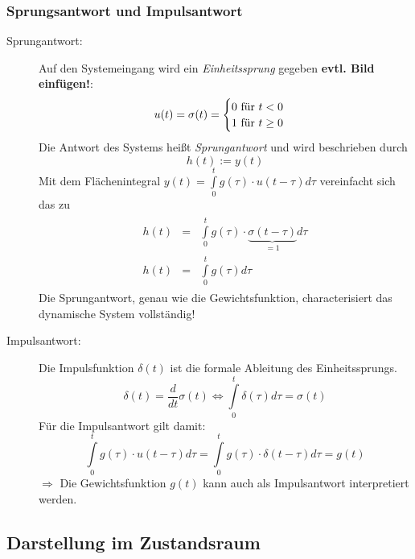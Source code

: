 \documentclass[12pt,a4paper,ngerman]{scrartcl}
\begin{document}
\subsubsection{Sprungsantwort und Impulsantwort}

\begin{description}
\item[Sprungantwort:] Auf den Systemeingang wird ein \emph{Einheitssprung} gegeben \textbf{evtl. Bild einfügen!}:
  \begin{equation*}
    u(t)=\sigma (t) =\begin{cases} 0 $ für $t<0\\1 $ für $ t \geq 0\end{cases}
  \end{equation*}
Die Antwort des Systems heißt \emph{Sprungantwort} und wird beschrieben durch
\begin{equation*}
  h(t):=y(t)
\end{equation*}
Mit dem Flächenintegral $y(t)=\int\limits_0^t{g(\tau)\cdot u(t-\tau)d\tau}$ vereinfacht sich das zu
\begin{align*}
  \begin{array}{lll}
    h(t)&=&\int\limits_0^t{g(\tau)\cdot \underbrace{\sigma (t-\tau)}_{=1}d\tau}\\
    h(t)&=&\int\limits_0^t{g(\tau)d\tau}  
  \end{array}
\end{align*}
Die Sprungantwort, genau wie die Gewichtsfunktion, characterisiert das dynamische System vollständig!
\item[Impulsantwort: ] Die Impulsfunktion $\delta (t)$ ist die formale Ableitung des Einheitssprungs.
  \begin{equation*}
    \delta (t)=\frac{d}{dt}\sigma (t) \Leftrightarrow \int\limits_0^t{\delta(\tau)d\tau =\sigma(t)}
  \end{equation*}
Für die Impulsantwort gilt damit:
\begin{equation*}
  \int\limits_0^t{g(\tau)\cdot u(t-\tau)d\tau} =\int\limits_0^t{g(\tau)\cdot \delta(t-\tau)d\tau }=g(t)
\end{equation*}
$\Rightarrow$ Die Gewichtsfunktion $g(t)$ kann auch als Impulsantwort interpretiert werden.

\end{description}

\subsection{Darstellung im Zustandsraum}
\end{document}
